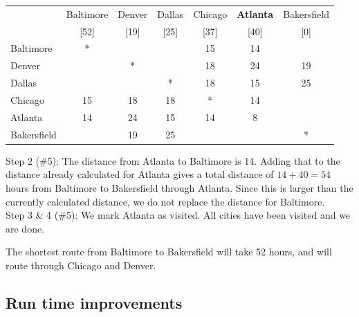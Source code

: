 \begin{example}{}{}
 \begin{center}
 \begin{tabular}{|l|c|c|c|c|c|c|}
 \hline
 & Baltimore & \cellcolor{yellow}Denver &  \cellcolor{yellow}Dallas &  \cellcolor{yellow}Chicago & \textbf{Atlanta} & \cellcolor{yellow}Bakersfield\\
 &[52]& \cellcolor{yellow}[19]& \cellcolor{yellow}[25]& \cellcolor{yellow}[37]&[40]&\cellcolor{yellow}[0]\\
 \hline
 Baltimore & * & \cellcolor{yellow}& \cellcolor{yellow}& \cellcolor{yellow}15&14&\cellcolor{yellow}\\
 \hline
 \cellcolor{yellow} Denver & \cellcolor{yellow}& \cellcolor{yellow}*& \cellcolor{yellow}& \cellcolor{yellow}18& \cellcolor{yellow}24&\cellcolor{yellow}19\\
 \hline
 \cellcolor{yellow}Dallas& \cellcolor{yellow}& \cellcolor{yellow}& \cellcolor{yellow}*& \cellcolor{yellow}18& \cellcolor{yellow}15&\cellcolor{yellow}25\\
 \hline
  \cellcolor{yellow}Chicago & \cellcolor{yellow}15& \cellcolor{yellow}18& \cellcolor{yellow}18& \cellcolor{yellow}*& \cellcolor{yellow}14&\cellcolor{yellow}\\
 \hline
 Atlanta & 14 &  \cellcolor{yellow}24& \cellcolor{yellow}15& \cellcolor{yellow}14&8&\cellcolor{yellow}\\
 \hline
 \cellcolor{yellow}Bakersfield &\cellcolor{yellow}&\cellcolor{yellow}19&\cellcolor{yellow}25&\cellcolor{yellow}&\cellcolor{yellow}&\cellcolor{yellow}*\\
 \hline
 \end{tabular}
 \end{center}


\noindent Step 2 (\#5):  The distance from Atlanta to Baltimore is 14.  Adding that to the distance already calculated for Atlanta gives a total distance of $14+40 = 54$ hours from Baltimore to Bakersfield through Atlanta.  Since this is larger than the currently calculated distance, we do not replace the distance for Baltimore.\\

\noindent Step 3 \& 4 (\#5):  We mark Atlanta as visited.  All cities have been visited and we are done.  

The shortest route from Baltimore to Bakersfield will take 52 hours, and will route through Chicago and Denver.
\end{example}

\subsection{Run time improvements}

